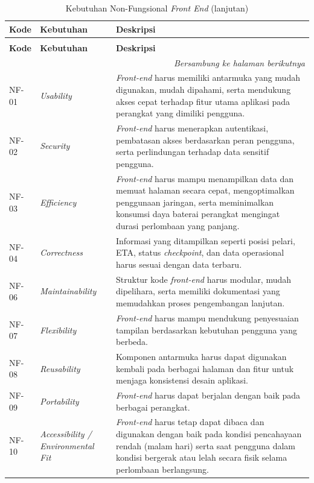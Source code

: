 \begin{longtable}{|p{1.8cm}|p{4cm}|p{7cm}|}
\caption{Kebutuhan Non-Fungsional \textit{Front End}} \\
\hline
\textbf{Kode} & \textbf{Kebutuhan} & \textbf{Deskripsi} \\ \hline
\endfirsthead

\caption[]{Kebutuhan Non-Fungsional \textit{Front End} (lanjutan)} \\
\hline
\textbf{Kode} & \textbf{Kebutuhan} & \textbf{Deskripsi} \\ \hline
\endhead

\hline
\multicolumn{3}{r}{\textit{Bersambung ke halaman berikutnya}} \\
\endfoot

\hline
\endlastfoot


NF-01 & \textit{Usability} &
\textit{Front-end} harus memiliki antarmuka yang mudah digunakan, mudah dipahami, serta mendukung akses cepat terhadap fitur utama aplikasi pada perangkat yang dimiliki pengguna. \\ \hline

NF-02 & \textit{Security} &
\textit{Front-end} harus menerapkan autentikasi, pembatasan akses berdasarkan peran pengguna, serta perlindungan terhadap data sensitif pengguna. \\ \hline

NF-03 & \textit{Efficiency} &
\textit{Front-end} harus mampu menampilkan data dan memuat halaman secara cepat, mengoptimalkan penggunaan jaringan, serta meminimalkan konsumsi daya baterai perangkat mengingat durasi perlombaan yang panjang. \\ \hline

NF-04 & \textit{Correctness} &
Informasi yang ditampilkan seperti posisi pelari, ETA, status \textit{checkpoint}, dan data operasional harus sesuai dengan data terbaru. \\ \hline

NF-06 & \textit{Maintainability} &
Struktur kode \textit{front-end} harus modular, mudah dipelihara, serta memiliki dokumentasi yang memudahkan proses pengembangan lanjutan. \\ \hline

NF-07 & \textit{Flexibility} &
\textit{Front-end} harus mampu mendukung penyesuaian tampilan berdasarkan kebutuhan pengguna yang berbeda. \\ \hline

NF-08 & \textit{Reusability} &
Komponen antarmuka harus dapat digunakan kembali pada berbagai halaman dan fitur untuk menjaga konsistensi desain aplikasi. \\ \hline

NF-09 & \textit{Portability} &
\textit{Front-end} harus dapat berjalan dengan baik pada berbagai perangkat. \\ \hline

NF-10 & \textit{Accessibility / Environmental Fit} &
\textit{Front-end} harus tetap dapat dibaca dan digunakan dengan baik pada kondisi pencahayaan rendah (malam hari) serta saat pengguna dalam kondisi bergerak atau lelah secara fisik selama perlombaan berlangsung. \\ \hline

\end{longtable}